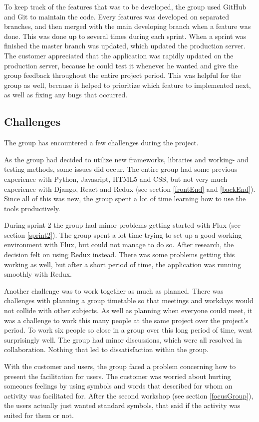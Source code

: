 To keep track of the features that was to be developed, the group used GitHub and Git to maintain the code. Every features was developed on separated branches, and then merged with the main developing branch when a feature was done. This was done up to several times during each sprint. When a sprint was finished the master branch was updated, which updated the production server. The customer appreciated that the application was rapidly updated on the production server, because he could test it whenever he wanted and give the group feedback throughout the entire project period. This was helpful for the group as well, because it helped to prioritize which feature to implemented next, as well as fixing any bugs that occurred.


\subsection{Challenges}
The group has encountered a few challenges during the project.

As the group had decided to utilize new frameworks, libraries and working- and testing methods, some issues did occur. The entire group had some previous experience with Python, Javasript, HTML5 and CSS, but not very much experience with Django, React and Redux (see section \ref{frontEnd} and \ref{backEnd}). Since all of this was new, the group spent a lot of time learning how to use the tools productively. 

During sprint 2 the group had minor problems getting started with Flux (see section \ref{sprint2}). The group spent a lot time trying to set up a good working environment with Flux, but could not manage to do so. After research, the decision felt on using Redux instead. There was some problems getting this working as well, but after a short period of time, the application was running smoothly with Redux. 

Another challenge was to work together as much as planned. There was challenges with planning a group timetable so that meetings and workdays would not collide with other subjects. As well as planning when everyone could meet, it was a challenge to work this many people at the same project over the project's period. To work six people so close in a group over this long period of time, went surprisingly well. The group had minor discussions, which were all resolved in collaboration. Nothing that led to dissatisfaction within the group.

With the customer and users, the group faced a problem concerning how to present the facilitation for users. The customer was worried about hurting someones feelings by using symbols and words that described for whom an activity was facilitated for. After the second workshop (see section \ref{focusGroup}), the users actually just wanted standard symbols, that said if the activity was suited for them or not.    


